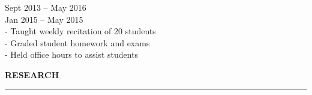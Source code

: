 \documentclass{resume} %
\begin{document}

\hspace*{1mm}{\em Teaching Assistant, Introduction to Computer Programming } \hfill Sept 2013 -- May 2016\\
\hspace*{1mm}{\em Teaching Assistant, JavaScript } \hfill Jan 2015 -- May 2015 \\
\hspace*{3mm}- Taught weekly recitation of 20 students \\
\hspace*{3mm}- Graded student homework and exams \\
\hspace*{3mm}- Held office hours to assist students


\medskip
\MakeUppercase{\bf Research}
\medskip
\hrule
\end{document}
